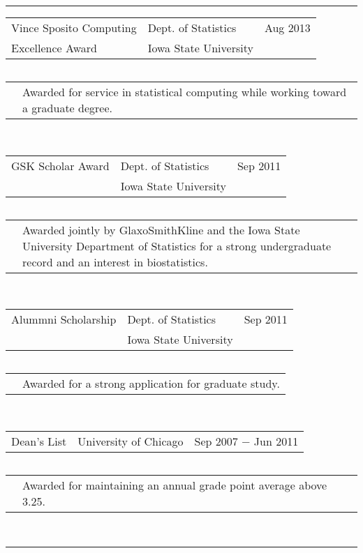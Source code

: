 \documentclass{article}
\newcommand{\q}{$\quad$ \newline}
\newcommand{\vl}{4.25}
\newcommand{\wl}{8.4}
\newcommand{\ww}{13}
\newcommand{\myrule}{\noindent \rule{\textwidth}{1pt}}
\begin{document}
 
\myrule

\noindent \begin{tabular}{@{}p{\vl cm}p{\wl cm}l@{}}
Vince Sposito Computing & Dept. of Statistics & Aug 2013 \\
Excellence Award & Iowa State University &
\end{tabular} \q

\noindent \begin{tabular}{@{}p{\vl cm}p{\ww cm}@{}}
& Awarded for service in statistical computing while working toward a graduate degree.
\end{tabular} \q \q

\noindent \begin{tabular}{@{}p{\vl cm}p{\wl cm}l@{}}
GSK Scholar Award & Dept. of Statistics & Sep 2011 \\
& Iowa State University &
\end{tabular} \q

\noindent \begin{tabular}{@{}p{\vl cm}p{\ww cm}@{}}
& Awarded jointly by GlaxoSmithKline and the Iowa State University Department of Statistics for a strong undergraduate record and an interest in biostatistics.
\end{tabular} \q \q

\noindent \begin{tabular}{@{}p{\vl cm}p{\wl cm}l@{}}
Alummni Scholarship & Dept. of Statistics & Sep 2011 \\
& Iowa State University &
\end{tabular} \q

\noindent \begin{tabular}{@{}p{\vl cm}p{\ww cm}@{}}
& Awarded for a strong application for graduate study.
\end{tabular} \q \q

\noindent \begin{tabular}{@{}p{\vl cm}p{\wl cm}l@{}}
Dean's List & University of Chicago & Sep 2007 $-$ Jun 2011 \\
\end{tabular} \q

\noindent \begin{tabular}{@{}p{\vl cm}p{\ww cm}@{}}
& Awarded for maintaining an annual grade point average above 3.25. 
\end{tabular} \q \q 



\myrule
\nocite{*}

\noindent  \q
\end{document}
